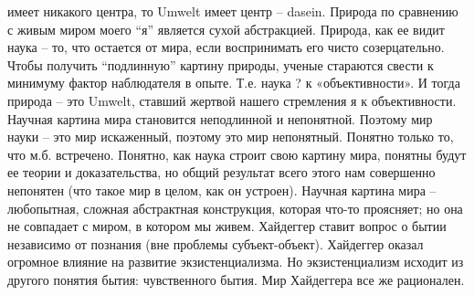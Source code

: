 \documentclass[12pt]{article}
\begin{document}
имеет никакого центра, то Umwelt имеет центр – dasein. Природа по сравнению с живым миром моего “я”
является сухой абстракцией. Природа, как ее видит наука – то, что остается от мира, если воспринимать его
чисто созерцательно. Чтобы получить “подлинную” картину природы, ученые стараются свести к минимуму
фактор наблюдателя в опыте. Т.е. наука ? к «объективности». И тогда природа – это Umwelt, ставший жертвой
нашего стремления я к объективности. Научная картина мира становится неподлинной и непонятной.
Поэтому мир науки – это мир искаженный, поэтому это мир непонятный. Понятно только то, что м.б. встречено.
Понятно, как наука строит свою картину мира, понятны будут ее теории и доказательства, но общий результат
всего этого нам совершенно непонятен (что такое мир в целом, как он устроен). Научная картина мира –
любопытная, сложная абстрактная конструкция, которая что-то проясняет; но она не совпадает с миром, в
котором мы живем.
Хайдеггер ставит вопрос о бытии независимо от познания (вне проблемы субъект-объект).
Хайдеггер оказал огромное влияние на развитие экзистенциализма. Но экзистенциализм исходит из другого
понятия бытия: чувственного бытия.
Мир Хайдеггера все же рационален.


\newpage
\end{document}
